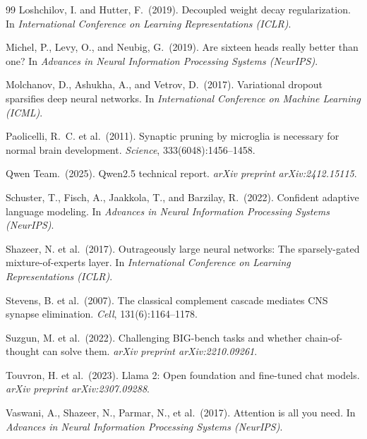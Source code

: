 \documentclass{article}
\begin{document}
\begin{thebibliography}{99}
Loshchilov, I. and Hutter, F.\ (2019).
\newblock Decoupled weight decay regularization.
\newblock In \emph{International Conference on Learning Representations (ICLR)}.

Michel, P., Levy, O., and Neubig, G.\ (2019).
\newblock Are sixteen heads really better than one?
\newblock In \emph{Advances in Neural Information Processing Systems (NeurIPS)}.

Molchanov, D., Ashukha, A., and Vetrov, D.\ (2017).
\newblock Variational dropout sparsifies deep neural networks.
\newblock In \emph{International Conference on Machine Learning (ICML)}.

Paolicelli, R.~C. et al.\ (2011).
\newblock Synaptic pruning by microglia is necessary for normal brain development.
\newblock \emph{Science}, 333(6048):1456--1458.

Qwen Team.\ (2025).
\newblock Qwen2.5 technical report.
\newblock \emph{arXiv preprint arXiv:2412.15115}.

Schuster, T., Fisch, A., Jaakkola, T., and Barzilay, R.\ (2022).
\newblock Confident adaptive language modeling.
\newblock In \emph{Advances in Neural Information Processing Systems (NeurIPS)}.

Shazeer, N. et al.\ (2017).
\newblock Outrageously large neural networks: The sparsely-gated mixture-of-experts layer.
\newblock In \emph{International Conference on Learning Representations (ICLR)}.

Stevens, B. et al.\ (2007).
\newblock The classical complement cascade mediates CNS synapse elimination.
\newblock \emph{Cell}, 131(6):1164--1178.

Suzgun, M. et al.\ (2022).
\newblock Challenging BIG-bench tasks and whether chain-of-thought can solve them.
\newblock \emph{arXiv preprint arXiv:2210.09261}.

Touvron, H. et al.\ (2023).
\newblock Llama 2: Open foundation and fine-tuned chat models.
\newblock \emph{arXiv preprint arXiv:2307.09288}.

Vaswani, A., Shazeer, N., Parmar, N., et al.\ (2017).
\newblock Attention is all you need.
\newblock In \emph{Advances in Neural Information Processing Systems (NeurIPS)}.


\end{thebibliography}
\end{document}
